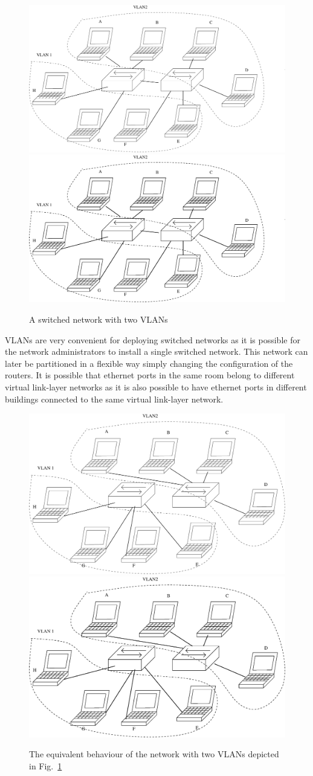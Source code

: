 \begin{figure}
\centering
\ifpdf
\includegraphics[width=0.5\linewidth]{Figures/Vlan.pdf}
\else
\includegraphics[width=0.5\linewidth]{Figures/Vlan.eps}
\fi
\caption{A switched network with two VLANs}
\label{fig:Vlan}
\end{figure}

VLANs are very convenient for deploying switched networks as it is possible for the network administrators to install a single switched network.
This network can later be partitioned in a flexible way simply changing the configuration of the routers.
It is possible that ethernet ports in the same room belong to different virtual link-layer networks as it is also possible to have ethernet ports in different buildings connected to the same virtual link-layer network.

\begin{figure}
\centering
\ifpdf
\includegraphics[width=0.5\linewidth]{Figures/Equivalent.pdf}
\else
\includegraphics[width=0.5\linewidth]{Figures/Equivalent.eps}
\fi
\caption{The equivalent behaviour of the network with two VLANs depicted in Fig.~\ref{fig:Vlan}}
\label{fig:Equivalent}
\end{figure}

